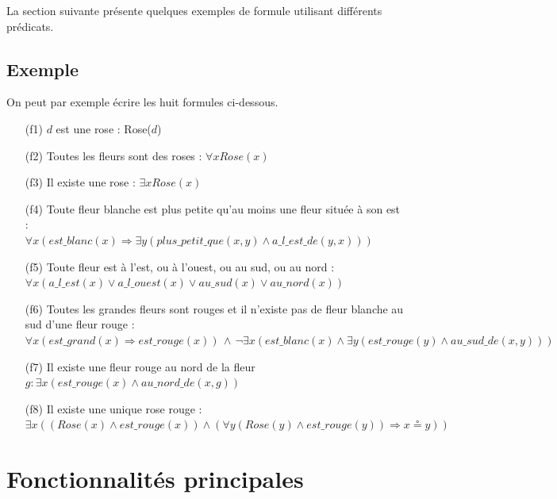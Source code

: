 \documentclass{article}
\theoremstyle{plain}
\theoremstyle{remark}
\begin{document}
La section suivante présente quelques exemples de formule utilisant
différents prédicats.

\subsection{Exemple}

On peut par exemple écrire les huit formules ci-dessous.
\begin{itemize}
    \item [(f1)] $d$ est une rose : Rose($d$)
    \item [(f2)] Toutes les fleurs sont des roses : $\forall x Rose(x)$
    \item [(f3)] Il existe une rose : $\exists x Rose(x)$
    \item [(f4)] Toute fleur blanche est plus petite qu'au moins une fleur située à son est :\\
      $\forall x (est\_blanc(x) \Rightarrow \exists y
      (plus\_petit\_que(x, y) \wedge a\_l\_est\_de(y, x)))$
    \item [(f5)] Toute fleur est à l'est, ou à l'ouest, ou au sud, ou au nord : \\
$\forall x (a\_l\_est(x) \vee a\_l\_ouest(x) \vee au\_sud(x) \vee au\_nord(x))$
    \item [(f6)] Toutes les grandes fleurs sont rouges et il n'existe pas de fleur blanche au sud d'une fleur rouge : \\
    $\forall x (est\_grand(x) \Rightarrow est\_rouge(x))\, \wedge \,\neg \exists x (est\_blanc(x) \wedge \exists y (est\_rouge(y) \wedge au\_sud\_de(x, y)))$
    \item [(f7)] Il existe une fleur rouge au nord de la fleur $g : \exists x (est\_rouge(x) \wedge au\_nord\_de(x, g))$
    \item [(f8)] Il existe une unique rose rouge : \\
    $\exists x ((Rose(x) \wedge est\_rouge(x)) \wedge (\forall y (Rose(y) \wedge est\_rouge(y)) \Rightarrow x \circeq y))$
\end{itemize}


\section{Fonctionnalités principales}
\end{document}
